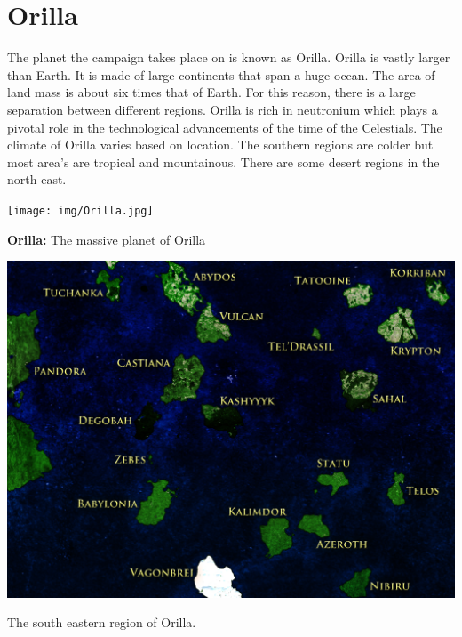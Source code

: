 \section{Orilla}

The planet the campaign takes place on is known as Orilla. Orilla is vastly larger than Earth. It is made of large continents that span a huge ocean. The area of land mass is about six times that of Earth. For this reason, there is a large separation between different regions. Orilla is rich in neutronium which plays a pivotal role in the technological advancements of the time of the Celestials. The climate of Orilla varies based on location. The southern regions are colder but most area's are tropical and mountainous. There are some desert regions in the north east.

\begin{center}
	\texttt{[image: img/Orilla.jpg]}
	
	{\textbf{Orilla:} The massive planet of Orilla}
\end{center}

\begin{center}
	\includegraphics[width=0.7\linewidth]{img/Orilla_SE.jpg}
	
	{The south eastern region of Orilla.}
\end{center}
